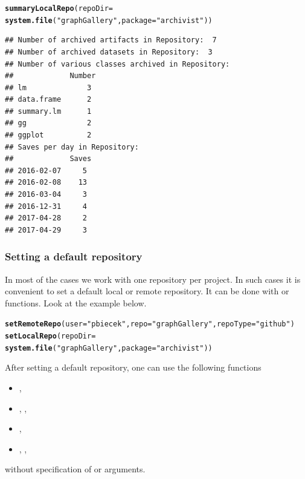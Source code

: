 \documentclass[nojss]{jss}\usepackage[]{graphicx}\usepackage[]{color}
\makeatletter
\newcommand{\hlstr}[1]{\textcolor[rgb]{0.192,0.494,0.8}{#1}}%
\newcommand{\hlstd}[1]{\textcolor[rgb]{0.345,0.345,0.345}{#1}}%
\newcommand{\hlkwc}[1]{\textcolor[rgb]{0.333,0.667,0.333}{#1}}%
\newcommand{\hlkwd}[1]{\textcolor[rgb]{0.737,0.353,0.396}{\textbf{#1}}}%
\newenvironment{kframe}{%
 \def\at@end@of@kframe{}%
 \ifinner\ifhmode%
  \def\at@end@of@kframe{\end{minipage}}%
  \begin{minipage}{\columnwidth}%
 \fi\fi%
 \def\FrameCommand##1{\hskip\@totalleftmargin \hskip-\fboxsep
 \colorbox{shadecolor}{##1}\hskip-\fboxsep
     \hskip-\linewidth \hskip-\@totalleftmargin \hskip\columnwidth}%
 \MakeFramed {\advance\hsize-\width
   \@totalleftmargin\z@ \linewidth\hsize
   \@setminipage}}%
 {\par\unskip\endMakeFramed%
 \at@end@of@kframe}
\newenvironment{knitrout}{}{} %
\makeatother
\begin{document}
\begin{knitrout}
\color{fgcolor}\begin{kframe}
\begin{alltt}
\hlkwd{summaryLocalRepo}\hlstd{(}\hlkwc{repoDir} \hlstd{=}
    \hlkwd{system.file}\hlstd{(}\hlstr{"graphGallery"}\hlstd{,} \hlkwc{package} \hlstd{=} \hlstr{"archivist"}\hlstd{))}
\end{alltt}
\begin{verbatim}
## Number of archived artifacts in Repository:  7 
## Number of archived datasets in Repository:  3 
## Number of various classes archived in Repository: 
##             Number
## lm              3
## data.frame      2
## summary.lm      1
## gg              2
## ggplot          2
## Saves per day in Repository: 
##             Saves
## 2016-02-07     5
## 2016-02-08    13
## 2016-03-04     3
## 2016-12-31     4
## 2017-04-28     2
## 2017-04-29     3
\end{verbatim}
\end{kframe}
\end{knitrout}


\subsubsection{Setting a default repository}

In most of the cases we work with one repository per project. In such cases it is convenient to set a default local or remote repository. It can be done with  or  functions. Look at the example below.

\begin{knitrout}
\color{fgcolor}\begin{kframe}
\begin{alltt}
\hlkwd{setRemoteRepo}\hlstd{(}\hlkwc{user} \hlstd{=} \hlstr{"pbiecek"}\hlstd{,} \hlkwc{repo} \hlstd{=} \hlstr{"graphGallery"}\hlstd{,} \hlkwc{repoType} \hlstd{=} \hlstr{"github"}\hlstd{)}
\hlkwd{setLocalRepo}\hlstd{(}\hlkwc{repoDir} \hlstd{=}
    \hlkwd{system.file}\hlstd{(}\hlstr{"graphGallery"}\hlstd{,} \hlkwc{package} \hlstd{=} \hlstr{"archivist"}\hlstd{))}
\end{alltt}
\end{kframe}
\end{knitrout}


After setting a default repository, one can use the following functions
\begin{itemize}
\item {},
\item {}, , 
\item {}, 
\item {}, , 
\end{itemize}
without specification of  or  arguments. 
\end{document}
